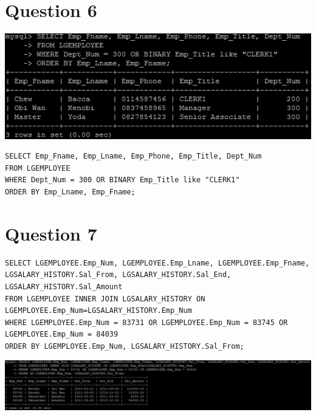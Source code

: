 \documentclass[a4paper,10pt]{article}
\begin{document}
\section*{Question 6}
\includegraphics{Queries/Question_6/Q6_screenshot.jpg}
\lstset{
            language=SQL,
            breaklines=true
            }
        \begin{lstlisting}[frame=single]
        SELECT Emp_Fname, Emp_Lname, Emp_Phone, Emp_Title, Dept_Num
FROM LGEMPLOYEE
WHERE Dept_Num = 300 OR BINARY Emp_Title like "CLERK1"
ORDER BY Emp_Lname, Emp_Fname;

        \end{lstlisting}
\section*{Question 7}
\lstset{
            language=SQL,
            breaklines=true
            }
        \begin{lstlisting}[frame=single]
        SELECT LGEMPLOYEE.Emp_Num, LGEMPLOYEE.Emp_Lname, LGEMPLOYEE.Emp_Fname, LGSALARY_HISTORY.Sal_From, LGSALARY_HISTORY.Sal_End, LGSALARY_HISTORY.Sal_Amount
FROM LGEMPLOYEE INNER JOIN LGSALARY_HISTORY ON LGEMPLOYEE.Emp_Num=LGSALARY_HISTORY.Emp_Num
WHERE LGEMPLOYEE.Emp_Num = 83731 OR LGEMPLOYEE.Emp_Num = 83745 OR LGEMPLOYEE.Emp_Num = 84039
ORDER BY LGEMPLOYEE.Emp_Num, LGSALARY_HISTORY.Sal_From;

        \end{lstlisting}
\includegraphics{Queries/Question_7/Q7_screenshot.jpg}
\end{document}

